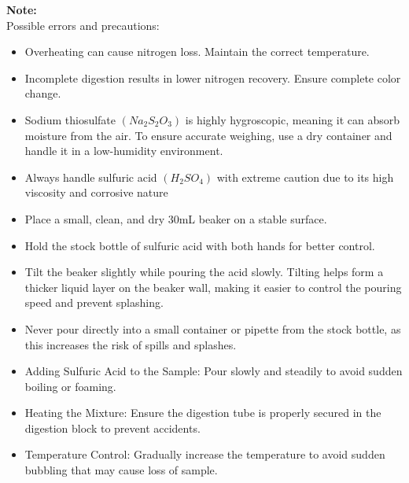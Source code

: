 \documentclass[hidelinks]{report}
\begin{document}
            \noindent \textbf{Note:} \\
            \noindent Possible errors and precautions:
            \begin{itemize}
                \item Overheating can cause nitrogen loss. Maintain the correct temperature.
                \item Incomplete digestion results in lower nitrogen recovery. Ensure complete color change.
                \item Sodium thiosulfate \((Na_2S_2O_3)\) is highly hygroscopic, meaning it can absorb moisture from the air. To ensure accurate weighing, use a dry container and handle it in a low-humidity environment.
                \item Always handle sulfuric acid \((H_2SO_4)\) with extreme caution due to its high viscosity and corrosive nature 
                \item Place a small, clean, and dry 30mL beaker on a stable surface.
                \item Hold the stock bottle of sulfuric acid with both hands for better control.
                \item Tilt the beaker slightly while pouring the acid slowly. Tilting helps form a thicker liquid layer on the beaker wall, making it easier to control the pouring speed and prevent splashing.
                \item Never pour directly into a small container or pipette from the stock bottle, as this increases the risk of spills and splashes.
                \item Adding Sulfuric Acid to the Sample: Pour slowly and steadily to avoid sudden boiling or foaming.
                \item Heating the Mixture: Ensure the digestion tube is properly secured in the digestion block to prevent accidents.
                \item Temperature Control: Gradually increase the temperature to avoid sudden bubbling that may cause loss of sample.
            \end{itemize}
\end{document}
